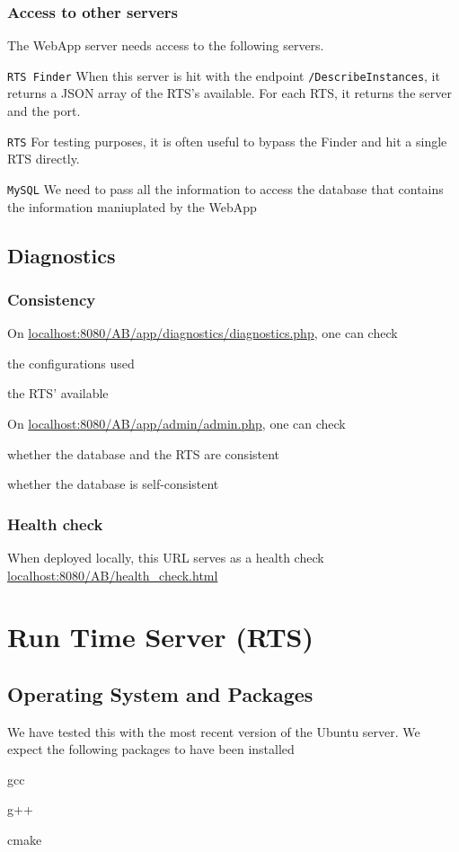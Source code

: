 \documentclass[letterpaper]{article}
\begin{document}
\subsubsection{Access to other servers}

The WebApp server needs access to the following servers. 
\be
\item {\tt RTS Finder} When this server is hit with the endpoint
  {\tt/DescribeInstances}, it returns a JSON array of the RTS's available. For
  each RTS, it returns the server and the port.
\item {\tt RTS} For testing purposes, it is often useful to bypass the Finder
  and hit a single RTS directly.
\item {\tt MySQL} We need to pass all the information to access the database
  that contains the information maniuplated by the WebApp
  \ee

\subsection{Diagnostics}

\subsubsection{Consistency}

On \url{localhost:8080/AB/app/diagnostics/diagnostics.php}, one can check
\be
\item the configurations used
\item the RTS' available
  \ee

On \url{localhost:8080/AB/app/admin/admin.php}, one can check
\be
\item whether the database and the RTS are consistent
\item whether the database is self-consistent \TBC
\ee 

\subsubsection{Health check}
When deployed locally, this URL serves as a health check
\url{localhost:8080/AB/health_check.html}

\section{Run Time Server (RTS)}

\subsection{Operating System and Packages}
We have tested this with the most recent version of the Ubuntu server. 
We expect the following packages to have been installed
\be
\item gcc
\item g++
\item cmake
\ee
\end{document}
